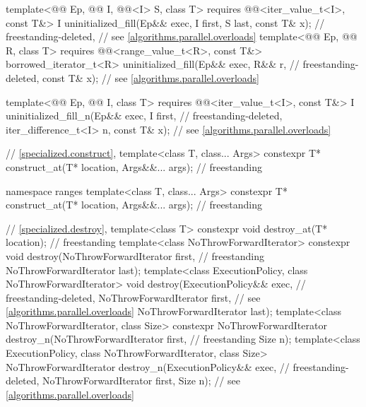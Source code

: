 \begin{codeblock}
{{    template<@@ Ep, @@ I,
             @@<I> S, class T>
      requires @@<iter_value_t<I>, const T&>
        I uninitialized_fill(Ep&& exec, I first, S last, const T& x);       // freestanding-deleted,
                                                                            // see \ref{algorithms.parallel.overloads}
    template<@@ Ep, @@ R, class T>
      requires @@<range_value_t<R>, const T&>
        borrowed_iterator_t<R> uninitialized_fill(Ep&& exec, R&& r,         // freestanding-deleted,
                                                  const T& x);              // see \ref{algorithms.parallel.overloads}

    template<@@ Ep, @@ I, class T>
      requires @@<iter_value_t<I>, const T&>
        I uninitialized_fill_n(Ep&& exec, I first,                          // freestanding-deleted,
                               iter_difference_t<I> n, const T& x);         // see \ref{algorithms.parallel.overloads}
  }

  // \ref{specialized.construct}, 
  template<class T, class... Args>
    constexpr T* construct_at(T* location, Args&&... args);                         // freestanding

  namespace ranges {
    template<class T, class... Args>
      constexpr T* construct_at(T* location, Args&&... args);                       // freestanding
  }

  // \ref{specialized.destroy}, 
  template<class T>
    constexpr void destroy_at(T* location);                                         // freestanding
  template<class NoThrowForwardIterator>
    constexpr void destroy(NoThrowForwardIterator first,                            // freestanding
                           NoThrowForwardIterator last);
  template<class ExecutionPolicy, class NoThrowForwardIterator>
    void destroy(ExecutionPolicy&& exec,                                    // freestanding-deleted,
                 NoThrowForwardIterator first,                              // see \ref{algorithms.parallel.overloads}
                 NoThrowForwardIterator last);
  template<class NoThrowForwardIterator, class Size>
    constexpr NoThrowForwardIterator destroy_n(NoThrowForwardIterator first,        // freestanding
                                               Size n);
  template<class ExecutionPolicy, class NoThrowForwardIterator, class Size>
    NoThrowForwardIterator destroy_n(ExecutionPolicy&& exec,                // freestanding-deleted,
                                     NoThrowForwardIterator first, Size n); // see \ref{algorithms.parallel.overloads}

}
\end{codeblock}
